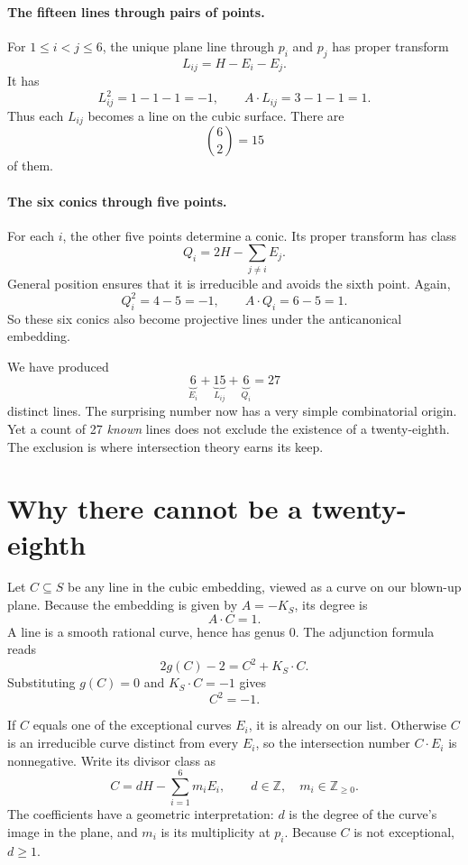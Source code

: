 \paragraph{The fifteen lines through pairs of points.}
For \(1\leq i<j\leq6\), the unique plane line through \(p_i\) and \(p_j\) has proper transform
\[
 L_{ij}=H-E_i-E_j.
\]
It has
\[
 L_{ij}^2=1-1-1=-1,\qquad
 A\cdot L_{ij}=3-1-1=1.
\]
Thus each \(L_{ij}\) becomes a line on the cubic surface. There are
\[
 \binom62=15
\]
of them.

\paragraph{The six conics through five points.}
For each \(i\), the other five points determine a conic. Its proper transform has class
\[
 Q_i=2H-\sum_{j\ne i}E_j.
\]
General position ensures that it is irreducible and avoids the sixth point. Again,
\[
 Q_i^2=4-5=-1,\qquad A\cdot Q_i=6-5=1.
\]
So these six conics also become projective lines under the anticanonical embedding.

We have produced
\begin{equation}
 \underbrace{6}_{E_i}
 +\underbrace{15}_{L_{ij}}
 +\underbrace{6}_{Q_i}
 =27
 \label{eq:N20261109-6-15-6}
\end{equation}
distinct lines. The surprising number now has a very simple combinatorial origin. Yet a count of 27 \emph{known} lines does not exclude the existence of a twenty-eighth. The exclusion is where intersection theory earns its keep.

\section{Why there cannot be a twenty-eighth}

Let \(C\subseteq S\) be any line in the cubic embedding, viewed as a curve on our blown-up plane. Because the embedding is given by \(A=-K_S\), its degree is
\[
 A\cdot C=1.
\]
A line is a smooth rational curve, hence has genus \(0\). The adjunction formula reads
\[
 2g(C)-2=C^2+K_S\cdot C.
\]
Substituting \(g(C)=0\) and \(K_S\cdot C=-1\) gives
\begin{equation}
 C^2=-1.
 \label{eq:N20261109-minusone}
\end{equation}

If \(C\) equals one of the exceptional curves \(E_i\), it is already on our list. Otherwise \(C\) is an irreducible curve distinct from every \(E_i\), so the intersection number \(C\cdot E_i\) is nonnegative. Write its divisor class as
\[
 C=dH-\sum_{i=1}^6m_iE_i,
 \qquad d\in\mathbb Z,\quad m_i\in\mathbb Z_{\geq0}.
\]
The coefficients have a geometric interpretation: \(d\) is the degree of the curve's image in the plane, and \(m_i\) is its multiplicity at \(p_i\). Because \(C\) is not exceptional, \(d\geq1\).


